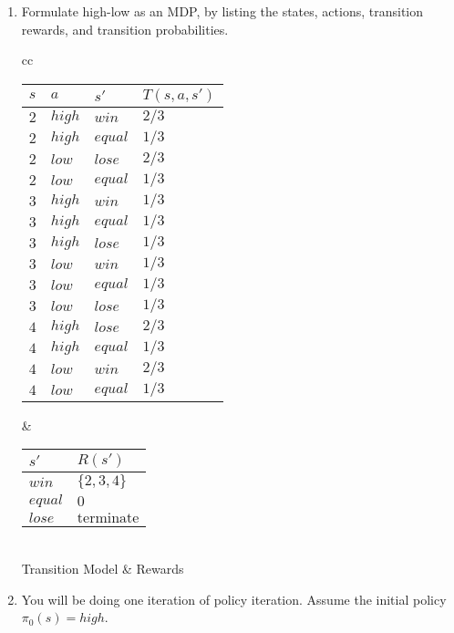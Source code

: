 \documentclass[12pt]{article}
\begin{document}
\begin{enumerate}

\item Formulate high-low as an MDP, by listing the states, actions,
  transition rewards, and transition probabilities.  

\begin{center}
\begin{tabular}{cc}
\begin{tabular}{|l|l|l|l|} \hline
$s$ & $a$ & $s'$ & $T(s,a,s')$ \\ \hline
$2$ & $high$ & $win$ & $2/3$ \\ \hline
$2$ & $high$ & $equal$ & $1/3$ \\ \hline
$2$ & $low$  & $lose$ & $2/3$ \\ \hline
$2$ & $low$  & $equal$ & $1/3$ \\ \hline
$3$ & $high$ & $win$   & $1/3$ \\ \hline
$3$ & $high$ & $equal$   & $1/3$ \\ \hline
$3$ & $high$ & $lose$ & $1/3$ \\ \hline
$3$ & $low$ & $win$   & $1/3$ \\ \hline
$3$ & $low$ & $equal$   & $1/3$ \\ \hline
$3$ & $low$ & $lose$ & $1/3$ \\ \hline
$4$ & $high$ & $lose$ & $2/3$ \\ \hline
$4$ & $high$ & $equal$ & $1/3$ \\ \hline
$4$ & $low$  & $win$ & $2/3$ \\ \hline
$4$ & $low$  & $equal$ & $1/3$ \\ \hline
\end{tabular} &
\begin{tabular}{|l|l|}\hline
$s'$       & $R(s')$ \\ \hline
$win$ & $\{2, 3, 4\}$ \\  \hline
$equal$  &  $0$ \\ \hline
$lose$ & $\text{terminate}$  \\ \hline
\end{tabular} \\
Transition Model & Rewards
\end{tabular}
\end{center}

\item You will be doing one iteration of policy iteration.  Assume the
  initial policy $\pi_0(s) = high$.

  \begin{enumerate}


\end{enumerate}
\end{enumerate}
\end{document}
